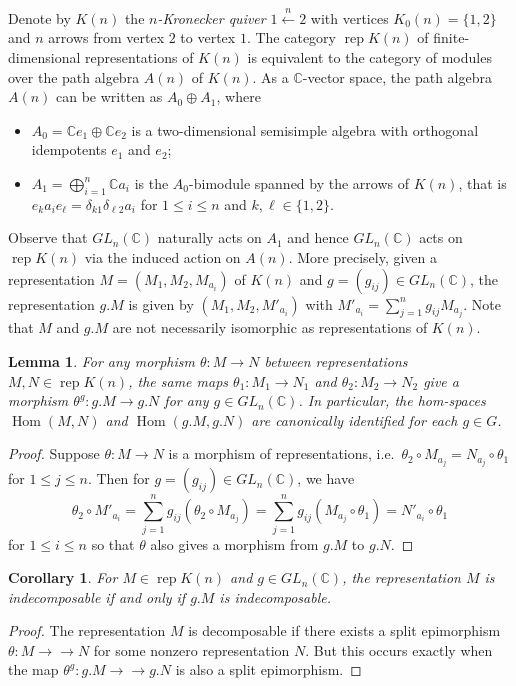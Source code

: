 \documentclass{amsart}
\newtheorem{corollary}[theorem]{Corollary}
\newtheorem{lemma}[theorem]{Lemma}
\newcommand{\rep}{\operatorname{rep}}
\newcommand{\CC}{\mathbb{C}}
\newcommand{\Hom}{\operatorname{Hom}}
\newcommand{\onto}{\to\!\!\!\!\!\to}
\begin{document}
\noindent Denote by $K(n)$ the \emph{$n$-Kronecker quiver} $1\stackrel{n}{\longleftarrow}2$ with vertices $K_0(n)=\{1,2\}$ and $n$ arrows from vertex $2$ to vertex $1$. 
The category $\rep K(n)$ of finite-dimensional representations of $K(n)$ is equivalent to the category of modules over the path algebra $A(n)$ of $K(n)$.
As a $\CC$-vector space, the path algebra $A(n)$ can be written as $A_0\oplus A_1$, where 
\begin{itemize}
  \item $A_0=\CC e_1\oplus \CC e_2$ is a two-dimensional semisimple algebra with orthogonal idempotents $e_1$ and $e_2$;
  \item $A_1=\bigoplus_{i=1}^n \CC a_i$ is the $A_0$-bimodule spanned by the arrows of $K(n)$, that is $e_ka_ie_\ell=\delta_{k1}\delta_{\ell2}a_i$ for $1\le i\le n$ and $k,\ell\in\{1,2\}$.
\end{itemize}
Observe that $GL_n(\CC)$ naturally acts on $A_1$ and hence $GL_n(\CC)$ acts on $\rep K(n)$ via the induced action on $A(n)$.
More precisely, given a representation $M=(M_1,M_2,M_{a_i})$ of $K(n)$ and $g=(g_{ij})\in GL_n(\CC)$, the representation $g.M$ is given by $(M_1,M_2,M'_{a_i})$ with $M'_{a_i}=\sum\limits_{j=1}^n g_{ij}M_{a_j}$.
Note that $M$ and $g.M$ are not necessarily isomorphic as representations of $K(n)$.
\begin{lemma}
  \label{le:hom equivariance}
  For any morphism $\theta:M\to N$ between representations $M,N\in\rep K(n)$, the same maps $\theta_1:M_1\to N_1$ and $\theta_2:M_2\to N_2$ give a morphism $\theta^g:g.M\to g.N$ for any $g\in GL_n(\CC)$.
  In particular, the hom-spaces $\Hom(M,N)$ and $\Hom(g.M,g.N)$ are canonically identified for each $g\in G$.
\end{lemma}
\begin{proof}
  Suppose $\theta:M\to N$ is a morphism of representations, i.e.\ $\theta_2\circ M_{a_j}=N_{a_j}\circ\theta_1$ for $1\le j\le n$.
  Then for $g=(g_{ij})\in GL_n(\CC)$, we have
  \[\theta_2\circ M'_{a_i}=\sum\limits_{j=1}^n g_{ij}(\theta_2\circ M_{a_j})=\sum\limits_{j=1}^n g_{ij}(M_{a_j}\circ\theta_1)=N'_{a_i}\circ\theta_1\]
  for $1\le i\le n$ so that $\theta$ also gives a morphism from $g.M$ to $g.N$. 
\end{proof}
\begin{corollary}
  \label{cor:indecomposability}
  For $M\in\rep K(n)$ and $g\in GL_n(\CC)$, the representation $M$ is indecomposable if and only if $g.M$ is indecomposable.
\end{corollary}
\begin{proof}
  The representation $M$ is decomposable if there exists a split epimorphism $\theta:M\onto N$ for some nonzero representation $N$.
  But this occurs exactly when the map $\theta^g:g.M\onto g.N$ is also a split epimorphism.
\end{proof}
\end{document}
